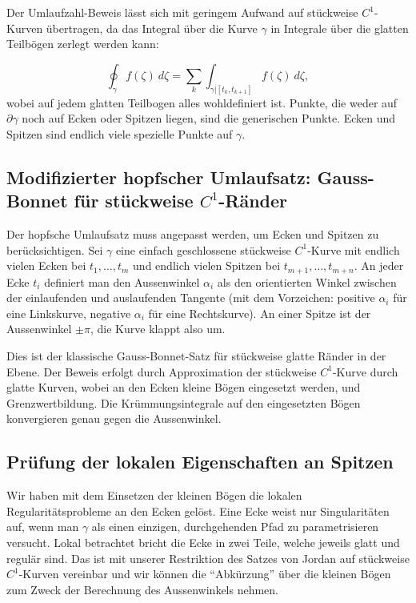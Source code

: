 Der Umlaufzahl-Beweis lässt sich mit geringem Aufwand auf stückweise $C^1$-Kurven übertragen, da das Integral über die Kurve $\gamma$ in Integrale über die glatten Teilbögen zerlegt werden kann:

\[
    \oint_{\gamma} f(\zeta) \ d\zeta = \sum_{k} \int_{\gamma | \left[ t_{k}, t_{k+1} \right]} f(\zeta) \ d\zeta,
\]
wobei auf jedem glatten Teilbogen alles wohldefiniert ist. Punkte, die weder auf $\partial \gamma$ noch auf Ecken oder Spitzen liegen, sind die generischen Punkte. Ecken und Spitzen sind endlich viele spezielle Punkte auf $\gamma$.



\subsection{Modifizierter hopfscher Umlaufsatz: Gauss-Bonnet für stückweise $C^1$-Ränder}

Der hopfsche Umlaufsatz muss angepasst werden, um Ecken und Spitzen zu berücksichtigen.
Sei $\gamma$ eine einfach geschlossene stückweise $C^1$-Kurve mit endlich vielen Ecken bei $t_{1}, \ldots, t_{m}$ und endlich vielen Spitzen bei $t_{m+1}, \ldots, t_{m+n}$.
An jeder Ecke $t_i$ definiert man den Aussenwinkel $\alpha_i$ als den orientierten Winkel zwischen der einlaufenden und auslaufenden Tangente (mit dem Vorzeichen: positive $\alpha_i$ für eine Linkskurve, negative $\alpha_i$ für eine Rechtskurve).
An einer Spitze ist der Aussenwinkel $\pm \pi$, die Kurve klappt also um.



Dies ist der klassische Gauss-Bonnet-Satz für stückweise glatte Ränder in der Ebene. 
Der Beweis erfolgt durch Approximation der stückweise $C^1$-Kurve durch glatte Kurven, wobei an den Ecken kleine Bögen eingesetzt werden, und Grenzwertbildung. 
Die Krümmungsintegrale auf den eingesetzten Bögen konvergieren genau gegen die Aussenwinkel.

\subsection{Prüfung der lokalen Eigenschaften an Spitzen}

Wir haben mit dem Einsetzen der kleinen Bögen die lokalen Regularitätsprobleme an den Ecken gelöst.
Eine Ecke weist nur Singularitäten auf, wenn man $\gamma$ als einen einzigen, durchgehenden Pfad zu parametrisieren versucht.
Lokal betrachtet bricht die Ecke in zwei Teile, welche jeweils glatt und regulär sind.
Das ist mit unserer Restriktion des Satzes von Jordan auf stückweise $C^1$-Kurven vereinbar und wir können die ``Abkürzung'' über die kleinen Bögen zum Zweck der Berechnung des Aussenwinkels nehmen.

